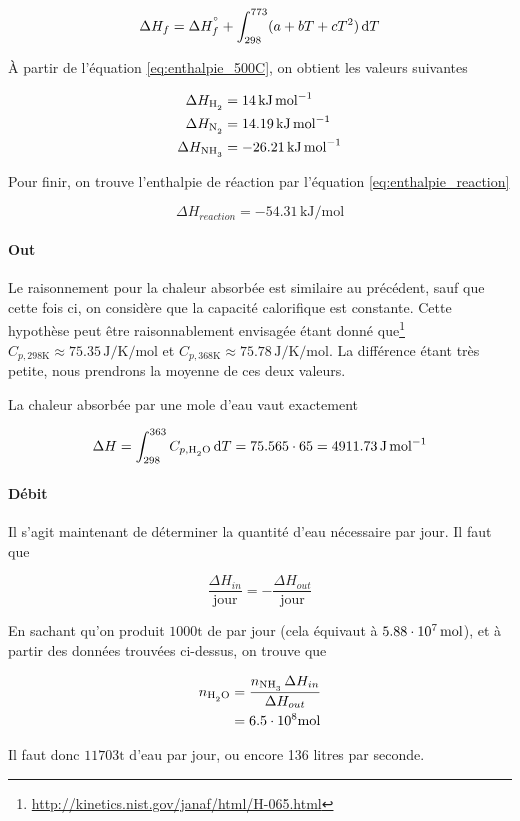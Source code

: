 \begin{equation}
	\Delta H_f = \Delta H_{f}^{\si{\degree}} + 
	\int_{298}^{773} (a + b T + c T^2) \, \mathrm{d}T
	\label{eq:enthalpie_500C}
\end{equation}

À partir de l'équation \ref{eq:enthalpie_500C}, 
on obtient les valeurs suivantes

\begin{align*}
	\Delta H_{\ce{H2}} &= 14 \, \si{\kilo\joule\per\mole} \\
	\Delta H_{\ce{N2}} &= 14.19 \, \si{\kilo\joule\per\mole} \\
	\Delta H_{\ce{NH3}} &= -26.21 \, \si{\kilo\joule\per\mole} 
\end{align*}

Pour finir, on trouve l'enthalpie de réaction par l'équation \ref{eq:enthalpie_reaction}

\[
	\Delta H_{reaction} = -54.31 \, \si{\kilo\joule\per\mole}
\]

\paragraph{Out}

Le raisonnement pour la chaleur absorbée est similaire 
au précédent, sauf que cette fois ci, 
on considère que la capacité calorifique est constante.
Cette hypothèse peut être raisonnablement envisagée 
étant donné que\footnote{\url{http://kinetics.nist.gov/janaf/html/H-065.html}} 
$C_{p, 298 \si{\kelvin}} \approx 75.35 \, \si{\joule\per\kelvin\per\mole}$ 
et $C_{p, 368 \si{\kelvin}} \approx 75.78 \, \si{\joule\per\kelvin\per\mole}$.
La différence étant très petite, 
nous prendrons la moyenne de ces deux valeurs. 

La chaleur absorbée par une mole d'eau vaut exactement

\begin{equation}
	\Delta H = \int_{298}^{363} C_{p, \ce{H2O}} \, \dif{T}
	= 75.565 \cdot 65 = 4911.73 \, \si{\joule\per\mole}
\end{equation}

\paragraph{Débit}

Il s'agit maintenant de déterminer la quantité d'eau nécessaire par jour.
Il faut que

\[
	\frac{\Delta H_{in}}{\mathrm{jour}} 
	= - \frac{\Delta H_{out}}{\mathrm{jour}}
\]

En sachant qu'on produit $1000 \si{\tonne}$ de  par jour
(cela équivaut à $5.88\cdot 10^{7} \, \si{\mole}$),
et à partir des données trouvées ci-dessus, 
on trouve que

\begin{align*}
	n_{\ce{H2O}} &= \frac{n_{\ce{NH3}} \, \Delta H_{in}}{\Delta H_{out}} \\
	&= 6.5\e{8} \si{\mole} 
\end{align*}

Il faut donc $11703 \si{\tonne}$ d'eau par jour, 
ou encore 136 litres par seconde.
